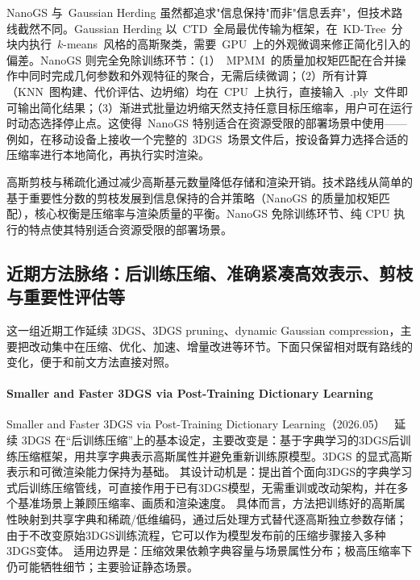 NanoGS 与~Gaussian Herding 虽然都追求"信息保持"而非"信息丢弃"，但技术路线截然不同。Gaussian Herding 以~CTD~全局最优传输为框架，在~KD-Tree~分块内执行~$k$-means~风格的高斯聚类，需要~GPU~上的外观微调来修正简化引入的偏差。NanoGS 则完全免除训练环节：（1）~MPMM~的质量加权矩匹配在合并操作中同时完成几何参数和外观特征的聚合，无需后续微调；（2）所有计算（KNN~图构建、代价评估、边坍缩）均在~CPU~上执行，直接输入~.ply~文件即可输出简化结果；（3）渐进式批量边坍缩天然支持任意目标压缩率，用户可在运行时动态选择停止点。这使得~NanoGS 特别适合在资源受限的部署场景中使用——例如，在移动设备上接收一个完整的~3DGS~场景文件后，按设备算力选择合适的压缩率进行本地简化，再执行实时渲染。

\begin{takeaway}
高斯剪枝与稀疏化通过减少高斯基元数量降低存储和渲染开销。技术路线从简单的基于重要性分数的剪枝发展到信息保持的合并策略（NanoGS 的质量加权矩匹配），核心权衡是压缩率与渲染质量的平衡。NanoGS 免除训练环节、纯 CPU 执行的特点使其特别适合资源受限的部署场景。
\end{takeaway}



\subsection{近期方法脉络：后训练压缩、准确紧凑高效表示、剪枝与重要性评估等}

这一组近期工作延续 3DGS、3DGS pruning、dynamic Gaussian compression，主要把改动集中在压缩、优化、加速、增量改进等环节。下面只保留相对既有路线的变化，便于和前文方法直接对照。

\paragraph{Smaller and Faster 3DGS via Post-Training Dictionary Learning}
Smaller and Faster 3DGS via Post-Training Dictionary Learning（2026.05）~\cite{2605_30396} 延续 3DGS 在“后训练压缩”上的基本设定，主要改变是：基于字典学习的3DGS后训练压缩框架，用共享字典表示高斯属性并避免重新训练原模型。3DGS 的显式高斯表示和可微渲染能力保持为基础。
其设计动机是：提出首个面向3DGS的字典学习式后训练压缩管线，可直接作用于已有3DGS模型，无需重训或改动架构，并在多个基准场景上兼顾压缩率、画质和渲染速度。
具体而言，方法把训练好的高斯属性映射到共享字典和稀疏/低维编码，通过后处理方式替代逐高斯独立参数存储；由于不改变原始3DGS训练流程，它可以作为模型发布前的压缩步骤接入多种3DGS变体。
适用边界是：压缩效果依赖字典容量与场景属性分布；极高压缩率下仍可能牺牲细节；主要验证静态场景。

